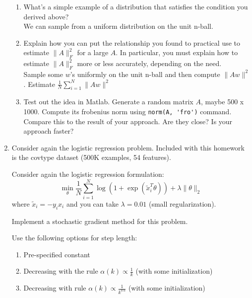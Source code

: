 \documentclass[12pt]{article}
\begin{document}
\begin{enumerate}
\begin{enumerate}
\item What's a simple example of a distribution that satisfies the condition you derived above? \\

\noindent
We can sample from a uniform distribution on the unit n-ball.\\

\item Explain how you can put the relationship you found to practical use to estimate $\|A\|_F^2$ for a large $A$. 
In particular, you must explain how to estimate $\|A\|_F^2$ more or less accurately, depending on the need. \\

\noindent
Sample some $w$'s uniformly on the unit n-ball and then compute $\|Aw\|^2$.  Estimate $\frac{1}{N} \sum_{i=1}^N \|Aw\|^2$\\

\item Test out the idea in Matlab. Generate a random matrix $A$, maybe 500 x 1000. Compute its frobenius norm
using \verb{norm(A, 'fro'){ command.  Compare this to the result of your approach. Are they close? Is your approach faster? \\

\end{enumerate}




\item Consider again the logistic regression problem. 
Included with this homework is the covtype dataset (500K examples, 54 features). 

Consider again the logistic regression formulation:
\[
\min_\theta \frac{1}{N}\sum_{i=1}^N \log(1+\exp(\tilde x_i^T \theta)) + \lambda\|\theta\|_2
\]
where $\tilde x_i = -y_i x_i$ and you can take $\lambda = 0.01$ (small regularization). 

Implement a stochastic gradient method for this problem. 

Use the following options for step length:
\begin{enumerate}
\item Pre-specified constant 
\item Decreasing with the rule $\alpha(k) \propto \frac{1}{k}$ (with some initialization)
\item Decreasing with rule $\alpha(k) \propto \frac{1}{k^{0.6}}$ (with some initialization) \\
\end{enumerate}


\end{enumerate}
\end{document}
